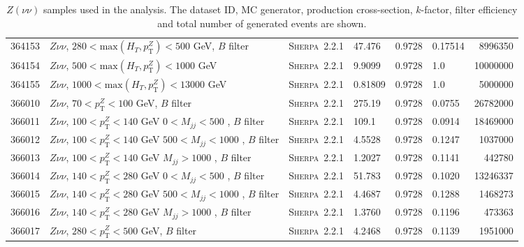 \begin{table}[!htb]
{\begin{tabular}{llllllr}
    364153 & $Z \nu\nu $, $280<\text{max}(H_T,p_{\text{T}}^Z)<500$ GeV, $B$ filter & \textsc{Sherpa}~2.2.1 &            47.476   & 0.9728& 0.17514  &  8996350 \\
    364154 & $Z \nu\nu $, $500<\text{max}(H_T,p_{\text{T}}^Z)<1000$ GeV                      & \textsc{Sherpa}~2.2.1 &  9.9099   & 0.9728& 1.0 	 & 10000000 \\
    364155 & $Z \nu\nu $, $1000<\text{max}(H_T,p_{\text{T}}^Z)<13000$ GeV                      & \textsc{Sherpa}~2.2.1 &0.81809  & 0.9728& 1.0 	 &  5000000 \\
    366010 & $Z \nu\nu $, $70<p_{\text{T}}^Z<100$ GeV, $B$ filter & \textsc{Sherpa}~2.2.1 & 275.19 & 0.9728 & 0.0755 & 26782000\\
    366011 & $Z \nu\nu $, $100<p_{\text{T}}^Z<140$ GeV $0<M_{jj}<500$ , $B$ filter & \textsc{Sherpa}~2.2.1 & 109.1 & 0.9728 & 0.0914 & 18469000\\
    366012 & $Z \nu\nu $, $100<p_{\text{T}}^Z<140$ GeV $500<M_{jj}<1000$ , $B$ filter &  \textsc{Sherpa}~2.2.1 & 4.5528 & 0.9728 & 0.1247 & 1037000\\
    366013 & $Z \nu\nu $, $100<p_{\text{T}}^Z<140$ GeV $M_{jj}>1000$ , $B$ filter &\textsc{Sherpa}~2.2.1 & 1.2027 & 0.9728 & 0.1141 & 442780\\
    366014 & $Z \nu\nu $, $140<p_{\text{T}}^Z<280$ GeV $0<M_{jj}<500$ , $B$ filter &  \textsc{Sherpa}~2.2.1 & 51.783 & 0.9728 & 0.1020 &  13246337\\
    366015 & $Z \nu\nu $, $140<p_{\text{T}}^Z<280$ GeV $500<M_{jj}<1000$ , $B$ filter &  \textsc{Sherpa}~2.2.1 & 4.4687 & 0.9728 & 0.1288 & 1468273\\
    366016 & $Z \nu\nu $, $140<p_{\text{T}}^Z<280$ GeV $M_{jj}>1000$ , $B$ filter &  \textsc{Sherpa}~2.2.1 & 1.3760 & 0.9728 & 0.1196 & 473363\\
    366017 & $Z \nu\nu $, $280<p_{\text{T}}^Z<500$ GeV, $B$ filter &  \textsc{Sherpa}~2.2.1 & 4.2468 & 0.9728 & 0.1139 & 1951000\\
    \bottomrule
  \end{tabular}
  \caption{$Z(\nu\nu)$ samples used in the analysis. The dataset ID, MC generator, production cross-section,
$k$-factor, filter efficiency and total number of generated events are shown.}
\label{tabular:mc_samples_Zvvjets}
}
\end{table}